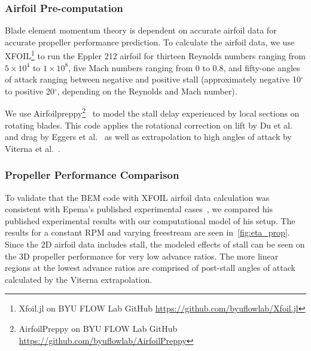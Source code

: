 \documentclass[conf]{new-aiaa}
\begin{document}
\subsubsection{Airfoil Pre-computation}


Blade element momentum theory is dependent on accurate airfoil data for accurate propeller performance prediction. To calculate the airfoil data, we use XFOIL\footnote{Xfoil.jl on BYU FLOW Lab GitHub \href{https://github.com/byuflowlab/Xfoil.jl}{https://github.com/byuflowlab/Xfoil.jl}} to run the Eppler 212 airfoil for thirteen Reynolds numbers ranging from $5 \times 10^4$ to $1 \times 10^8$, five Mach numbers ranging from 0 to 0.8, and fifty-one angles of attack ranging between negative and positive stall (approximately negative 10$^\circ$ to positive 20$^\circ$, depending on the Reynolds and Mach number).

We use Airfoilpreppy\footnote{AirfoilPreppy on BYU FLOW Lab GitHub \href{https://github.com/byuflowlab/AirfoilPreppy}{https://github.com/byuflowlab/AirfoilPreppy}}~\cite{airfoilpreppy} to model the stall delay experienced by local sections on rotating blades. This code applies the rotational correction on lift by Du et al.~\cite{Du:1998aa} and drag by Eggers et al.~\cite{Eggers:2003aa} as well as extrapolation to high angles of attack by Viterna et al.~\cite{Viterna:1982aa}.

\subsubsection{Propeller Performance Comparison}

\label{PropPerformance}

To validate that the BEM code with XFOIL airfoil data calculation was consistent with Epema's published experimental cases~\cite{epema}, we compared his published experimental results with our computational model of his setup. The results for a constant RPM and varying freestream are seen in~\cref{fig:eta_prop}. Since the 2D airfoil data includes stall, the modeled effects of stall can be seen on the 3D propeller performance for very low advance ratios. The more linear regions at the lowest advance ratios are comprised of post-stall angles of attack calculated by the Viterna extrapolation.
\end{document}
